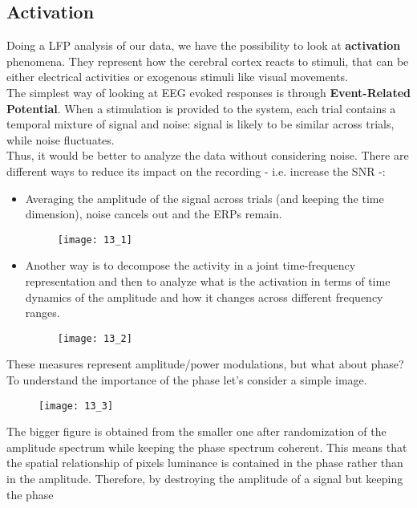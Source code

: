 \subsection{Activation}
Doing a LFP analysis of our data, we have the possibility to look at
\textbf{activation} phenomena. They represent how the cerebral cortex reacts to
stimuli, that can be either electrical activities or exogenous stimuli like visual
movements.\\
The simplest way of looking at EEG evoked responses is through \textbf{Event-Related
    Potential}. When a stimulation is provided to the system, each trial contains a
temporal mixture of signal and noise: signal is likely to be similar across trials,
while noise fluctuates.\\
Thus, it would be better to analyze the data without considering noise. There are
different ways to reduce its impact on the recording - i.e. increase the SNR -:
\begin{itemize}
    \item Averaging the amplitude of the signal across trials (and keeping the time
          dimension), noise cancels out and the ERPs remain.
          \begin{figure}[H]
              \centering
              \texttt{[image: 13\_1]}
          \end{figure}
    \item Another way is to decompose the activity in a joint time-frequency
          representation and then to analyze what is the activation in terms of
          time dynamics of the amplitude and how it changes across different frequency
          ranges.
          \begin{figure}[H]
              \centering
              \texttt{[image: 13\_2]}
          \end{figure}
\end{itemize}
These measures represent amplitude/power modulations, but what about phase? To
understand the importance of the phase let's consider a simple image.
\begin{figure}[H]
    \centering
    \texttt{[image: 13\_3]}
\end{figure}
The bigger figure is obtained from the smaller one after randomization of the amplitude
spectrum while keeping the phase spectrum coherent. This means that the spatial
relationship of pixels luminance is contained in the phase rather than in the
amplitude. Therefore, by destroying the amplitude of a signal but keeping the phase
